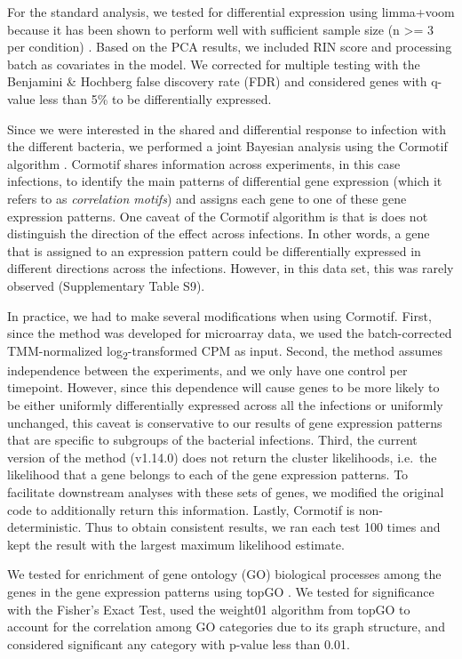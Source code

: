 For the standard analysis, we tested for differential expression using
limma+voom \citep{Smyth2004, Smyth2005, Law2014} because it has been
shown to perform well with sufficient sample size (n \textgreater{}= 3
per condition) \citep{Rapaport2013, Soneson2013}. Based on the PCA
results, we included RIN score and processing batch as covariates in the
model. We corrected for multiple testing with the Benjamini \& Hochberg
false discovery rate (FDR) \citep{Benjamini1995} and considered genes
with q-value less than 5\% to be differentially expressed.

Since we were interested in the shared and differential response to
infection with the different bacteria, we performed a joint Bayesian
analysis using the Cormotif algorithm \citep{Wei2015}. Cormotif shares
information across experiments, in this case infections, to identify the
main patterns of differential gene expression (which it refers to as
\emph{correlation motifs}) and assigns each gene to one of these gene
expression patterns. One caveat of the Cormotif algorithm is that is
does not distinguish the direction of the effect across infections. In
other words, a gene that is assigned to an expression pattern could be
differentially expressed in different directions across the infections.
However, in this data set, this was rarely observed (Supplementary Table
S9).

In practice, we had to make several modifications when using Cormotif.
First, since the method was developed for microarray data, we used the
batch-corrected TMM-normalized log\textsubscript{2}-transformed CPM as
input. Second, the method assumes independence between the experiments,
and we only have one control per timepoint. However, since this
dependence will cause genes to be more likely to be either uniformly
differentially expressed across all the infections or uniformly
unchanged, this caveat is conservative to our results of gene expression
patterns that are specific to subgroups of the bacterial infections.
Third, the current version of the method (v1.14.0) does not return the
cluster likelihoods, i.e.~the likelihood that a gene belongs to each of
the gene expression patterns. To facilitate downstream analyses with
these sets of genes, we modified the original code to additionally
return this information. Lastly, Cormotif is non-deterministic. Thus to
obtain consistent results, we ran each test 100 times and kept the
result with the largest maximum likelihood estimate.

We tested for enrichment of gene ontology (GO) biological processes
among the genes in the gene expression patterns using topGO
\citep{Alexa2006}. We tested for significance with the Fisher's Exact
Test, used the weight01 algorithm from topGO to account for the
correlation among GO categories due to its graph structure, and
considered significant any category with p-value less than 0.01.

